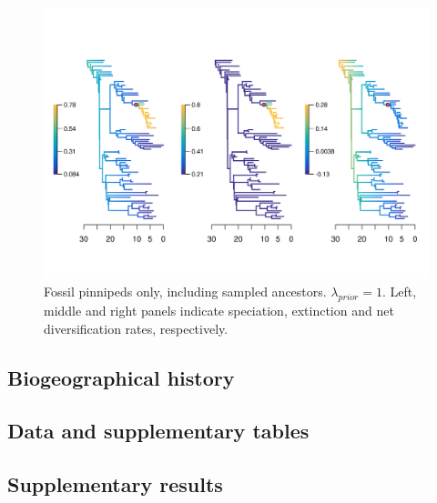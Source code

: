 \documentclass[a4paper, 12pt]{article}
\begin{document}
\begin{figure}[H]
  \centering
  \includegraphics[width = \linewidth]{figures/diversification/fossil-only-with-sampled-ancestors/sensitivity-analysis-fossil-only-full.png}
  \caption{Fossil pinnipeds only, including sampled ancestors. $\lambda_{prior} = 1$. Left, middle and right panels indicate speciation, extinction and net diversification rates, respectively.}
  \label{fig-fossil-only-full}
\end{figure}


\newpage
\begin{landscape}
\section{Biogeographical history}
\subsection{Data and supplementary tables}



\newpage


\newpage

\end{landscape}
\subsection{Supplementary results}
\end{document}
